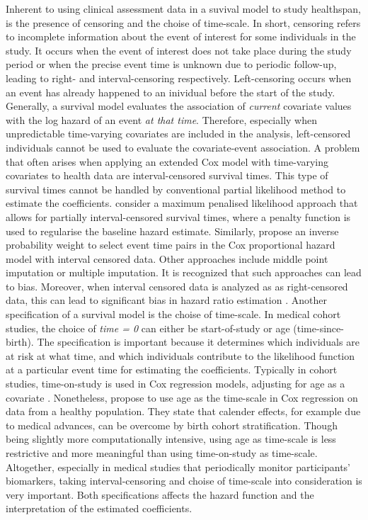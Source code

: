 Inherent to using clinical assessment data in a suvival model to study healthspan, is the presence of censoring and the choise of time-scale. In short, censoring refers to incomplete information about the event of interest for some individuals in the study. It occurs when the event of interest does not take place during the study period or when the precise event time is unknown due to periodic follow-up, leading to right- and interval-censoring respectively. Left-censoring occurs when an event has already happened to an inividual before the start of the study. Generally, a survival model evaluates the association of \textit{current} covariate values with the log hazard of an event \textit{at that time}. Therefore, especially when unpredictable time-varying covariates are included in the analysis, left-censored individuals cannot be used to evaluate the covariate-event association. A problem that often arises when applying an extended Cox model with time-varying covariates to health data are interval-censored survival times. This type of survival times cannot be handled by conventional partial likelihood method to estimate the coefficients. \cite{webb2023cox} consider a maximum penalised likelihood approach that allows for partially interval-censored survival times, where a penalty function is used to regularise the baseline hazard estimate. Similarly, \cite{heller2011proportional} propose an inverse probability weight to select event time pairs in the Cox proportional hazard model with interval censored data. Other approaches include middle point imputation or multiple imputation. It is recognized that such approaches can lead to bias. Moreover, when interval censored data is analyzed as as right-censored data, this can lead to significant bias in hazard ratio estimation \citep{sun2010comparison}. Another specification of a survival model is the choise of time-scale. In medical cohort studies, the choice of \textit{time = 0} can either be start-of-study or age (time-since-birth). The specification is important because it determines which individuals are at risk at what time, and which individuals contribute to the likelihood function at a particular event time for estimating the coefficients. Typically in cohort studies, time-on-study is used in Cox regression models, adjusting for age as a covariate \citep{canchola2003cox}. Nonetheless, \cite{kom1997time} propose to use age as the time-scale in Cox regression on data from a healthy population. They state that calender effects, for example due to medical advances, can be overcome by birth cohort stratification. Though being slightly more computationally intensive, using age as time-scale is less restrictive and more meaningful than using time-on-study as time-scale. Altogether, especially in medical studies that periodically monitor participants' biomarkers, taking interval-censoring and choise of time-scale into consideration is very important. Both specifications affects the hazard function and the interpretation of the estimated coefficients.



